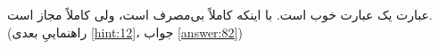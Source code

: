 \section{}
\paragraph{}\label{hint:284}
عبارت  یک عبارت خوب  است. با اینکه کاملاً بی‌مصرف است، ولی کاملاً مجاز است. (راهنماییِ بعدی \ref{hint:12}، جواب \ref{answer:82})
